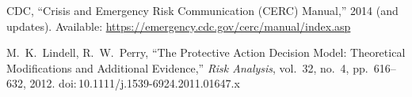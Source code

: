 \documentclass[11pt,twocolumn]{article}
\begin{document}
\begin{thebibliography}{99}
CDC, ``Crisis and Emergency Risk Communication (CERC) Manual,'' 2014 (and updates). Available: \url{https://emergency.cdc.gov/cerc/manual/index.asp}

M.\ K.\ Lindell, R.\ W.\ Perry, ``The Protective Action Decision Model: Theoretical Modifications and Additional Evidence,'' \emph{Risk Analysis}, vol.\ 32, no.\ 4, pp.\ 616--632, 2012. doi:\,10.1111/j.1539-6924.2011.01647.x

\end{thebibliography}

\balance
\end{document}
